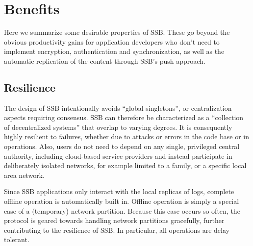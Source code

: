 \documentclass[9pt,sigconf,rewiew]{acmart}
\begin{document}
%
%
%
%

\section{Benefits}
\label{sect:yay}

Here we summarize some desirable properties of SSB. These go beyond the obvious productivity gains for application developers who don't need to implement encryption, authentication and synchronization, as well as the automatic replication of the content through SSB's push approach.

\subsection{Resilience}

The design of SSB intentionally avoids ``global singletons'', or centralization aspects requiring consensus. SSB can therefore be characterized as a ``collection of decentralized systems'' that overlap to varying degrees. It is consequently highly resilient to failures, whether due to attacks or errors in the code base or in operations. Also, users do not need to depend on any single, privileged central authority, including cloud-based service providers and instead participate in deliberately isolated networks, for example limited to a family, or a specific local area network.

Since SSB applications only interact with the local replicas of logs, complete offline operation is automatically built in. Offline operation is simply a special case of a (temporary) network partition. Because this case occurs so often, the protocol is geared towards handling network partitions gracefully, further contributing to the resilience of SSB. In particular, all operations are delay tolerant.
\end{document}
